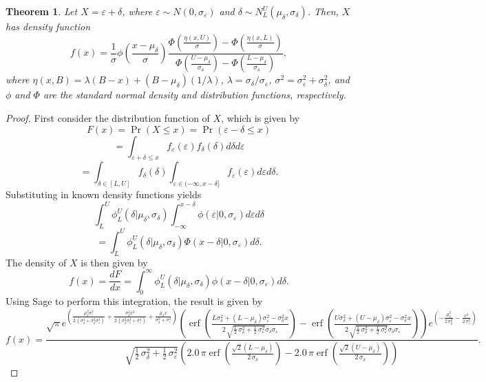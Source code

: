 \documentclass{article}
\newtheorem{theorem}{Theorem}
\newcommand{\ep}{\varepsilon}
\begin{document}
\begin{theorem}
	Let $X = \ep + \delta$, where $\ep\sim N(0, \sigma_\ep)$ and $\delta\sim N_L^U(\mu_\delta, \sigma_\delta)$. Then, $X$ has density function 
	$$f(x) = \frac{1}{\sigma}\phi\left(\frac{x - \mu_\delta}{\sigma}\right) \frac{\Phi\left(\frac{\eta(x, U)}{\sigma}\right) - \Phi\left(\frac{\eta(x, L)}{\sigma}\right)}{\Phi\left(\frac{U - \mu_\delta}{\sigma_\delta}\right) - \Phi\left(\frac{L - \mu_\delta}{\sigma_\delta}\right)},$$
	where $\eta(x, B) = \lambda (B - x) + (B - \mu_\delta) (1 / \lambda)$, $\lambda = \sigma_\delta / \sigma_\ep$, $\sigma^2 = \sigma_\ep^2 + \sigma_\delta^2$, and $\phi$ and $\Phi$ are the standard normal density and distribution functions, respectively.
\end{theorem}
\begin{proof}
		First consider the distribution function of $X$, which is given by
	$$F(x) = \Pr(X \leq x) = \Pr(\ep - \delta \leq x)$$
	$$= \int_{\ep + \delta \leq x} f_\ep(\ep) f_\delta(\delta) d\delta d\ep$$
	$$= \int_{\delta\in[L, U]} f_\delta(\delta) \int_{\ep\in (-\infty, x - \delta]} f_\ep(\ep) d\ep d\delta.$$
	Substituting in known density functions yields
	$$\int_L^U \phi_L^U(\delta | \mu_\delta, \sigma_\delta) \int_{-\infty}^{x - \delta} \phi(\ep | 0, \sigma_\ep) d\ep d\delta$$
	$$= \int_L^U \phi_L^U(\delta | \mu_\delta, \sigma_\delta) \Phi(x - \delta | 0, \sigma_\ep) d\delta.$$
	The density of $X$ is then given by
	$$f(x) = \frac{dF}{dx} = \int_0^\infty \phi_L^U(\delta | \mu_\delta, \sigma_\delta) \phi(x - \delta | 0, \sigma_\ep) d\delta.$$
	Using Sage to perform this integration, the result is given by
	$$f(x) = \frac{{\sqrt{\pi} e^{\left(\frac{\mu_{\delta}^{2} \sigma_{\ep}^{2}}{2 \, {\left(\sigma_{\delta}^{4} + \sigma_{\delta}^{2} \sigma_{\ep}^{2}\right)}} + \frac{\sigma_{\delta}^{2} x^{2}}{2 \, {\left(\sigma_{\delta}^{2} \sigma_{\ep}^{2} + \sigma_{\ep}^{4}\right)}} + \frac{\mu_{\delta} x}{\sigma_{\delta}^{2} + \sigma_{\ep}^{2}}\right)} \left( \operatorname{erf}\left(\frac{L \sigma_{\delta}^{2} + {\left(L - \mu_{\delta}\right)} \sigma_{\ep}^{2} - \sigma_{\delta}^{2} x}{2 \, \sqrt{\frac{1}{2} \, \sigma_{\delta}^{2} + \frac{1}{2} \, \sigma_{\ep}^{2}} \sigma_{\delta} \sigma_{\ep}}\right)  - \operatorname{erf}\left(\frac{U \sigma_{\delta}^{2} + {\left(U - \mu_{\delta}\right)} \sigma_{\ep}^{2} - \sigma_{\delta}^{2} x}{2 \, \sqrt{\frac{1}{2} \, \sigma_{\delta}^{2} + \frac{1}{2} \, \sigma_{\ep}^{2}} \sigma_{\delta} \sigma_{\ep}}\right) \right)} e^{\left(-\frac{\mu_{\delta}^{2}}{2 \, \sigma_{\delta}^{2}} - \frac{x^{2}}{2 \, \sigma_{\ep}^{2}}\right)}}{\sqrt{\frac{1}{2} \, \sigma_{\delta}^{2} + \frac{1}{2} \, \sigma_{\ep}^{2}} {\left(2.0 \, \pi \operatorname{erf}\left(\frac{\sqrt{2} {\left(L - \mu_{\delta}\right)}}{2 \, \sigma_{\delta}}\right) - 2.0 \, \pi \operatorname{erf}\left(\frac{\sqrt{2} {\left(U - \mu_{\delta}\right)}}{2 \, \sigma_{\delta}}\right)\right)}}.$$

\end{proof}
\end{document}
